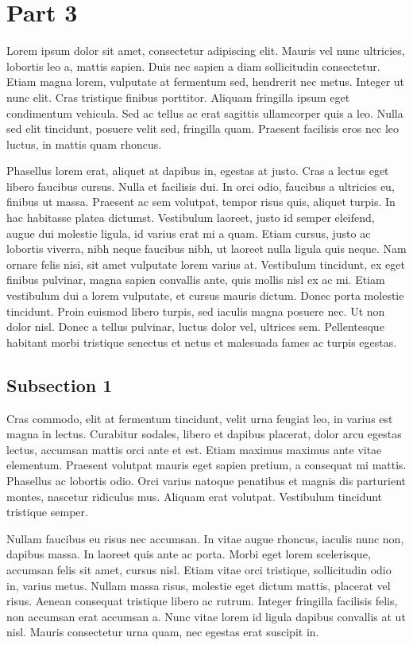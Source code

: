 \section{Part 3}

Lorem ipsum dolor sit amet, consectetur adipiscing elit. Mauris vel nunc ultricies, lobortis leo a, mattis sapien. Duis nec sapien a diam sollicitudin consectetur. Etiam magna lorem, vulputate at fermentum sed, hendrerit nec metus. Integer ut nunc elit. Cras tristique finibus porttitor. Aliquam fringilla ipsum eget condimentum vehicula. Sed ac tellus ac erat sagittis ullamcorper quis a leo. Nulla sed elit tincidunt, posuere velit sed, fringilla quam. Praesent facilisis eros nec leo luctus, in mattis quam rhoncus.

Phasellus lorem erat, aliquet at dapibus in, egestas at justo. Cras a lectus eget libero faucibus cursus. Nulla et facilisis dui. In orci odio, faucibus a ultricies eu, finibus ut massa. Praesent ac sem volutpat, tempor risus quis, aliquet turpis. In hac habitasse platea dictumst. Vestibulum laoreet, justo id semper eleifend, augue dui molestie ligula, id varius erat mi a quam. Etiam cursus, justo ac lobortis viverra, nibh neque faucibus nibh, ut laoreet nulla ligula quis neque. Nam ornare felis nisi, sit amet vulputate lorem varius at. Vestibulum tincidunt, ex eget finibus pulvinar, magna sapien convallis ante, quis mollis nisl ex ac mi. Etiam vestibulum dui a lorem vulputate, et cursus mauris dictum. Donec porta molestie tincidunt. Proin euismod libero turpis, sed iaculis magna posuere nec. Ut non dolor nisl. Donec a tellus pulvinar, luctus dolor vel, ultrices sem. Pellentesque habitant morbi tristique senectus et netus et malesuada fames ac turpis egestas.

\subsection{Subsection 1}

Cras commodo, elit at fermentum tincidunt, velit urna feugiat leo, in varius est magna in lectus. Curabitur sodales, libero et dapibus placerat, dolor arcu egestas lectus, accumsan mattis orci ante et est. Etiam maximus maximus ante vitae elementum. Praesent volutpat mauris eget sapien pretium, a consequat mi mattis. Phasellus ac lobortis odio. Orci varius natoque penatibus et magnis dis parturient montes, nascetur ridiculus mus. Aliquam erat volutpat. Vestibulum tincidunt tristique semper.

Nullam faucibus eu risus nec accumsan. In vitae augue rhoncus, iaculis nunc non, dapibus massa. In laoreet quis ante ac porta. Morbi eget lorem scelerisque, accumsan felis sit amet, cursus nisl. Etiam vitae orci tristique, sollicitudin odio in, varius metus. Nullam massa risus, molestie eget dictum mattis, placerat vel risus. Aenean consequat tristique libero ac rutrum. Integer fringilla facilisis felis, non accumsan erat accumsan a. Nunc vitae lorem id ligula dapibus convallis at ut nisl. Mauris consectetur urna quam, nec egestas erat suscipit in.

